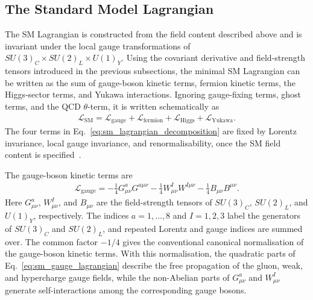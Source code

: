 \subsection{The Standard Model Lagrangian}
\label{subsec:sm_lagrangian}

The SM Lagrangian is constructed from the field content described above and is invariant under the local gauge transformations of $SU(3)_{C}\times SU(2)_{L}\times U(1)_{Y}$. 
Using the covariant derivative and field-strength tensors introduced in the previous subsections, the minimal SM Lagrangian can be written as the sum of gauge-boson kinetic terms, fermion kinetic terms, the Higgs-sector terms, and Yukawa interactions. 
Ignoring gauge-fixing terms, ghost terms, and the QCD $\theta$-term, it is written schematically as
\begin{align}
    \mathcal{L}_{\mathrm{SM}}
    =
    \mathcal{L}_{\mathrm{gauge}}
    +
    \mathcal{L}_{\mathrm{fermion}}
    +
    \mathcal{L}_{\mathrm{Higgs}}
    +
    \mathcal{L}_{\mathrm{Yukawa}}.
    \label{eq:sm_lagrangian_decomposition}
\end{align}
The four terms in Eq.~\eqref{eq:sm_lagrangian_decomposition} are fixed by Lorentz invariance, local gauge invariance, and renormalisability, once the SM field content is specified~\cite{tHooft1971,tHooftVeltman1972}.

The gauge-boson kinetic terms are
\begin{align}
    \mathcal{L}_{\mathrm{gauge}}
    =
    -
    \frac{1}{4}
    G_{\mu\nu}^{a}G^{a\mu\nu}
    -
    \frac{1}{4}
    W_{\mu\nu}^{I}W^{I\mu\nu}
    -
    \frac{1}{4}
    B_{\mu\nu}B^{\mu\nu}.
    \label{eq:sm_gauge_lagrangian}
\end{align}
Here $G_{\mu\nu}^{a}$, $W_{\mu\nu}^{I}$, and $B_{\mu\nu}$ are the field-strength tensors of $SU(3)_{C}$, $SU(2)_{L}$, and $U(1)_{Y}$, respectively. 
The indices $a=1,\ldots,8$ and $I=1,2,3$ label the generators of $SU(3)_{C}$ and $SU(2)_{L}$, and repeated Lorentz and gauge indices are summed over. 
The common factor $-1/4$ gives the conventional canonical normalisation of the gauge-boson kinetic terms. 
With this normalisation, the quadratic parts of Eq.~\eqref{eq:sm_gauge_lagrangian} describe the free propagation of the gluon, weak, and hypercharge gauge fields, while the non-Abelian parts of $G_{\mu\nu}^{a}$ and $W_{\mu\nu}^{I}$ generate self-interactions among the corresponding gauge bosons.


